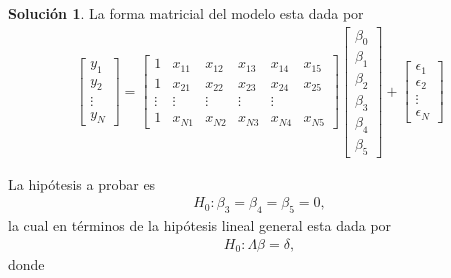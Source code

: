 \documentclass[12pt]{article}
\theoremstyle{plain}
\theoremstyle{definition}
\theoremstyle{definition}
\theoremstyle{definition}
\newtheorem*{solution}{Solución}
\begin{document}
\begin{solution}
La forma matricial del modelo esta dada por
\begin{align*}
\begin{bmatrix}
    y_1\\
 y_2\\
   \vdots \\
   y_N
\end{bmatrix}=\begin{bmatrix}
    1 & x_{11}& x_{12}& x_{13}& x_{14}& x_{15}\\
1 & x_{21}& x_{22}& x_{23}& x_{24}& x_{25}\\
   \vdots& \vdots & \vdots & \vdots & \vdots \\
  1 & x_{N1}& x_{N2}& x_{N3}& x_{N4}& x_{N5}
\end{bmatrix}\begin{bmatrix}
    \beta_0\\
\beta_1\\
   \beta_2 \\
  \beta_3\\
  \beta_4\\
  \beta_5
\end{bmatrix}+\begin{bmatrix}
    \epsilon_1\\
\epsilon_2\\
    \vdots \\
  \epsilon_N
\end{bmatrix}
\end{align*}

La hipótesis a probar es 
\begin{align*}
H_0:\beta_3 = \beta_4 = \beta_5 = 0, 
\end{align*}
la cual en términos de la hipótesis lineal general esta dada por
\begin{align*}
H_0:\Lambda\beta = \delta, 
\end{align*}
donde 


\end{solution}
\end{document}
